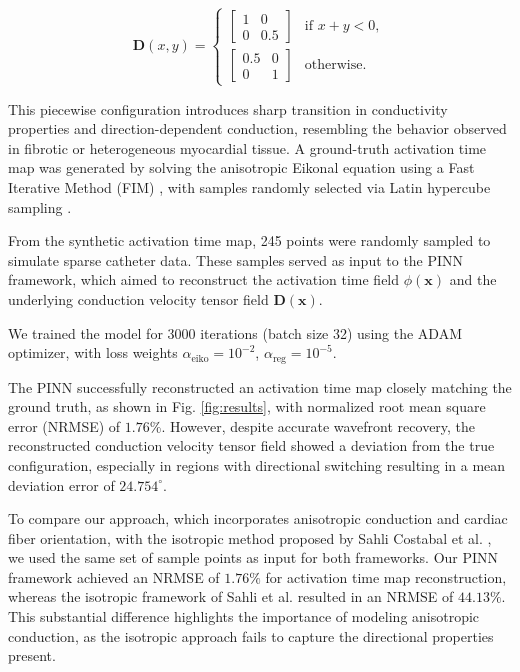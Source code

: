 \begin{equation}
\mathbf{D}(x, y) =
\begin{cases}
\begin{bmatrix} 1 & 0 \\ 0 & 0.5 \end{bmatrix} & \text{if } x + y < 0, \\
\begin{bmatrix} 0.5 & 0 \\ 0 & 1 \end{bmatrix} & \text{otherwise.}
\end{cases}
\end{equation}

This piecewise configuration introduces sharp transition in conductivity properties and direction-dependent conduction, resembling the behavior observed in fibrotic or heterogeneous myocardial tissue. A ground-truth activation time map was generated by solving the anisotropic Eikonal equation using a Fast Iterative Method (FIM) \cite{Grandits2021}, with samples randomly selected via Latin hypercube sampling \cite{Stein1987}.

From the synthetic activation time map, 245 points were randomly sampled to simulate sparse catheter data. These samples served as input to the PINN framework, which aimed to reconstruct the activation time field $\phi(\mathbf{x})$ and the underlying conduction velocity tensor field $\mathbf{D}(\mathbf{x})$.

We trained the model for 3000 iterations (batch size 32) using the ADAM optimizer, with loss weights $\alpha_{\text{eiko}} = 10^{-2}$, $\alpha_{\text{reg}} = 10^{-5}$.

The PINN successfully reconstructed an activation time map closely matching the ground truth, as shown in Fig. \ref{fig:results}, with normalized root mean square error (NRMSE) of $1.76\%$. However, despite accurate wavefront recovery, the reconstructed conduction velocity tensor field showed a deviation from the true configuration, especially in regions with directional switching resulting in a mean deviation error of $24.754^\circ$.

To compare our approach, which incorporates anisotropic conduction and cardiac fiber orientation, with the isotropic method proposed by Sahli Costabal et al. \cite{SahliCostabal2020}, we used the same set of sample points as input for both frameworks. Our PINN framework achieved an NRMSE of $1.76\%$ for activation time map reconstruction, whereas the isotropic framework of Sahli et al. resulted in an NRMSE of $44.13\%$. This substantial difference highlights the importance of modeling anisotropic conduction, as the isotropic approach fails to capture the directional properties present.

